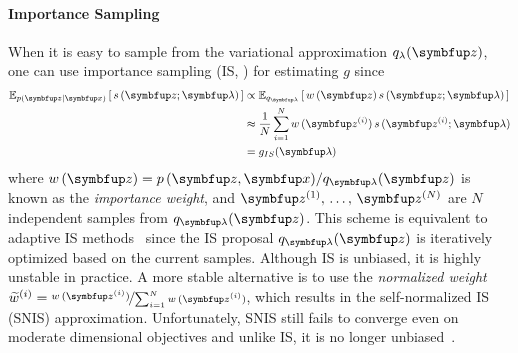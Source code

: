 \paragraph{Importance Sampling}
When it is easy to sample from the variational approximation \(q_{\lambda}(\vz)\), one can use importance sampling (IS, \citealt{robert_monte_2004, mcbook}) for estimating \(g\) since 
\vspace{-0.05in}
\begin{align}
  \Esub{p(\vz\mid\vx)}{ s\,(\vz; \vlambda) } 
  &\propto \Esub{q_{\vlambda}}{ w\,(\vz) \, s\,(\vz; \vlambda) } \\
  &\approx \frac{1}{N} \sum^{N}_{i=1} w\,(\vz^{(i)}) \, s\,(\vz^{(i)}; \vlambda) \\
  &= g_{IS}(\vlambda)
\end{align}
where \(w\,(\vz) = p\,(\vz,\vx) / q_{\vlambda}(\vz)\) is known as the \textit{importance weight}, and \(\vz^{(1)},\, \ldots,\, \vz^{(N)}\) are \(N\) independent samples from \(q_{\vlambda}(\vz)\).
This scheme is equivalent to adaptive IS methods~\citep{cappe_adaptive_2008, bugallo_adaptive_2017} since the IS proposal \(q_{\vlambda}(\vz)\) is iteratively optimized based on the current samples.
Although IS is unbiased, it is highly unstable in practice.
A more stable alternative is to use the \textit{normalized weight} \(\widetilde{w}^{(i)} = \nicefrac{w\,(\vz^{(i)})}{\sum_{i=1}^N w\,(\vz^{(i)}) }\), which results in the self-normalized IS (SNIS) approximation.
Unfortunately, SNIS still fails to converge even on moderate dimensional objectives and unlike IS, it is no longer unbiased~\citep{robert_monte_2004, mcbook}.

